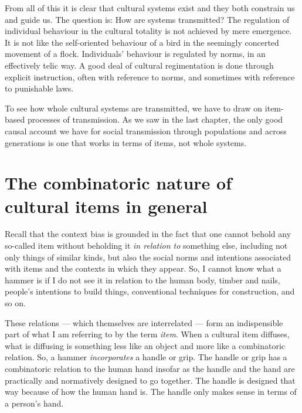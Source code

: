 From all of this it is clear that cultural systems exist and they both 
constrain us and guide us. The question is: How are systems transmitted? The regulation of individual behaviour in the cultural 
totality is not achieved by mere emergence. It is not like the self-oriented behaviour of a bird 
in the seemingly concerted movement of a flock. Individuals' behaviour 
is regulated by norms, in an effectively telic way. A good deal of 
cultural regimentation is done through explicit instruction, often with 
reference to norms, and sometimes with reference to punishable laws. 



To see how whole cultural systems are transmitted, we have to draw on item-based processes of transmission. As we 
saw in the last chapter, the only good causal account we have for social 
transmission through populations and across generations is one that 
works in terms of items, not whole systems.



\section{The combinatoric nature of cultural items in general}


Recall that the context bias is grounded in the fact that one cannot 
behold any so-called item without beholding it \textit{in relation to}
something else, including not only things of similar kinds, but also the social norms and intentions associated with items and 
the contexts in which they appear. So, I cannot know what a hammer is if I do not see it in relation to the human body, 
timber and nails, people's intentions to build things, conventional 
techniques for construction, and so on. 



These relations --- which themselves are interrelated --- form an indispensible 
part of what I am referring to by the term \textit{item}. When a cultural item 
diffuses, what is diffusing is something less like an object 
and more like a combinatoric relation. So, a hammer \textit{incorporates} a 
handle or grip. The handle or grip has a combinatoric relation to the 
human hand insofar as the handle and the hand are practically and 
normatively designed to go together. The handle is designed that way 
because of how the human hand is. The handle only makes sense in terms 
of a person's hand. 



